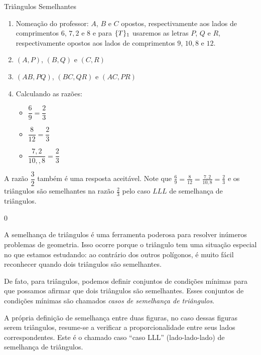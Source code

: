\begin{answer}{Triângulos Semelhantes}
{\begin{enumerate}[topsep=0pt]
\item {} 
Nomeação do professor: \(A\), \(B\) e \(C\) opostos, respectivamente aos lados de comprimentos $6$, $7{,}2$ e $8$ e para $\mathcal\{T\}_1{}$ usaremos as letras \(P\), \(Q\) e \(R\), respectivamente opostos aos lados de comprimentos $9$, $10{,}8$ e $12$.

\item {} 
\((A, P)\), \((B, Q)\) e \((C, R)\)

\item {} 
\((AB, PQ)\), \((BC, QR)\) e \((AC, PR)\)

\item {} 
Calculando as razões:
\begin{itemize}[topsep=0pt]
\item {} 
\(\dfrac{6}{9}=\dfrac{2}{3}\)

\item {} 
\(\dfrac{8}{12}=\dfrac{2}{3}\)

\item {} 
\(\dfrac{7{,}2}{10,{,}8}=\dfrac{2}{3}\)

\end{itemize}

\end{enumerate}

A razão \(\dfrac{3}{2}\) também é uma resposta aceitável. Note que \(\frac{6}{9}=\frac{8}{12}=\frac{7,2}{10,8}=\frac{2}{3}\) e os triângulos são semelhantes na razão \(\frac{2}{3}\) pelo caso \(LLL\)  de semelhança de triângulos.}
{0}
\end{answer}



A semelhança de triângulos é uma ferramenta poderosa para resolver inúmeros problemas de geometria. Isso ocorre porque o triângulo tem uma situação especial no que estamos estudando: ao contrário dos outros polígonos, é muito fácil reconhecer quando dois triângulos são semelhantes.

De fato, para triângulos, podemos definir conjuntos de condições mínimas para que possamos afirmar que dois triângulos são semelhantes. Esses conjuntos de condições mínimas são chamados \textit{casos de semelhança de triângulos}.

A própria definição de semelhança entre duas figuras, no caso dessas figuras serem triângulos, resume-se a verificar a proporcionalidade entre seus lados correspondentes. Este é o chamado caso “caso LLL” (lado-lado-lado) de semelhança de triângulos.

